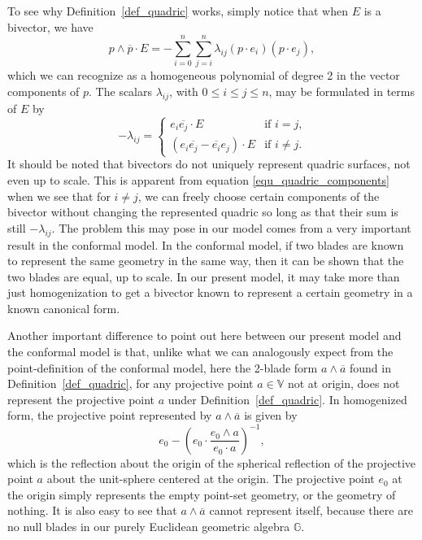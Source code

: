 \documentclass[12pt]{article}
\newcommand{\G}{\mathbb{G}}
\newcommand{\V}{\mathbb{V}}
\numberwithin{equation}{section}
\begin{document}
To see why Definition~\ref{def_quadric} works, simply notice that when $E$ is a bivector, we have
\begin{equation}\label{equ_homogeneous_polynomial}
p\wedge\overline{p}\cdot E=-\sum_{i=0}^n\sum_{j=i}^n \lambda_{ij}(p\cdot e_i)(p\cdot e_j),
\end{equation}
which we can recognize as a homogeneous polynomial of degree 2 in the vector components of $p$.
The scalars $\lambda_{ij}$, with $0\leq i\leq j\leq n$, may be formulated in terms of $E$ by
\begin{equation}\label{equ_quadric_components}
-\lambda_{ij} = \left\{\begin{array}{ll}
e_i\overline{e_j}\cdot E & \mbox{if $i=j$,} \\
\left(e_i\overline{e_j}-\overline{e_i}e_j\right)\cdot E & \mbox{if $i\neq j$.}
\end{array}\right.
\end{equation}
It should be noted that bivectors do not uniquely represent quadric surfaces, not even up to scale.
This is apparent from equation \eqref{equ_quadric_components} when we see that for $i\neq j$,
we can freely choose certain components of the bivector without changing the represented
quadric so long as that their sum is still $-\lambda_{ij}$.  The problem this may pose in our model
comes from a very important result in the conformal model.  In the conformal model, if
two blades are known to represent the same geometry in the same way, then it can be shown that the
two blades are equal, up to scale.  In our present model, it may take more than just
homogenization to get a bivector known to represent a certain geometry in a
known canonical form.

Another important difference to point out here between our present model and the conformal model is that,
unlike what we can analogously expect from the point-definition of the conformal model,
here the 2-blade form $a\wedge\overline{a}$ found in Definition~\ref{def_quadric}, for
any projective point $a\in\V$ not at origin, does not represent the projective point $a$ under Definition~\ref{def_quadric}.
In homogenized form, the projective point represented by $a\wedge\overline{a}$ is given by
\begin{equation}
e_0 - \left(e_0\cdot\frac{e_0\wedge a}{e_0\cdot a}\right)^{-1},
\end{equation}
which is the reflection about the origin of the spherical reflection of the projective point $a$
about the unit-sphere centered at the origin.  The projective point $e_0$ at the origin
simply represents the empty point-set geometry, or the geometry of nothing.  It is also
easy to see that $a\wedge\overline{a}$ cannot represent itself, because there are no
null blades in our purely Euclidean geometric algebra $\G$.
\end{document}
